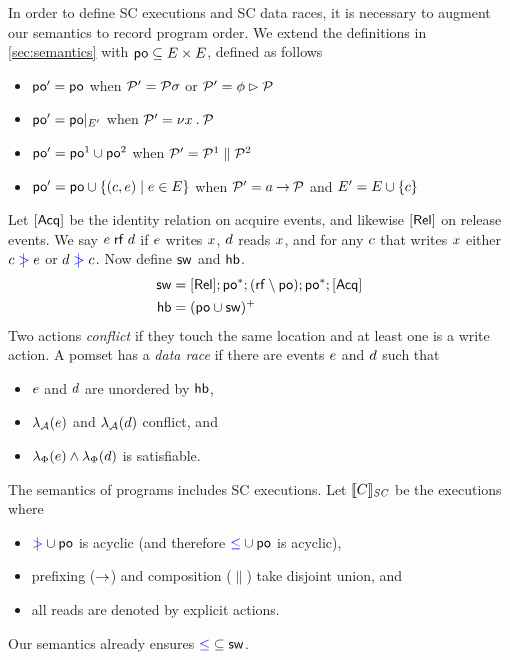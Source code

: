 In order to define SC executions and SC data races, it is necessary to
augment our semantics to record program order.  We extend the definitions in
\textsection\ref{sec:semantics} with
${\mathrel{\mathsf{po}}}\subseteq{E}\times{E}$, defined as follows
\begin{itemize}
\item
  ${\mathrel{\mathsf{po}}'} = {\mathrel{\mathsf{po}}}$
  when $\mathcal{P}'=\mathcal{P}\sigma$
  or $\mathcal{P}'=\phi\mathbin\rhd\mathcal{P}$
\item
  ${\mathrel{\mathsf{po}}'} = {\mathrel{\mathsf{po}}}\mathbin{|}_{E'}$
  when $\mathcal{P}'=\nu x\mathbin.\mathcal{P}$
\item
  ${\mathrel{\mathsf{po}}'} = {\mathrel{\mathsf{po}}}^1\cup{\ensuremath{\mathrel{\mathsf{po}}}}^2$
  when $\mathcal{P}'=\mathcal{P}^1\parallel\mathcal{P}^2$
\item
  ${\mathrel{\mathsf{po}}'} = {\mathrel{\mathsf{po}}}\cup\{(c,e)\mid e\in E\}$
  when $\mathcal{P}'=a\mathbin\rightarrow\mathcal{P}$ and $E' = E \cup \{c\}$
\end{itemize}
Let $[\mathsf{Acq}]$ be the identity relation on acquire events, and likewise $[\mathsf{Rel}]$ on release events.
We say $e\mathrel{\mathsf{rf}}d$ if $e$ writes $x$, $d$ reads $x$, and for any $c$ that writes $x$ either $c\mathrel{{\color{blue}\mkern4mu\mid\!\!\!>}}e$ or $d\mathrel{{\color{blue}\mkern4mu\mid\!\!\!>}}c$.
Now define $\mathrel{\mathsf{sw}}$ and $\mathrel{\mathsf{hb}}$.
\begin{align*}
  {\ensuremath{\mathrel{\mathsf{sw}}}} &= [\mathsf{Rel}]; {\mathrel{\mathsf{po}}}^*; ({\mathrel{\mathsf{rf}}}\setminus{\ensuremath{\mathrel{\mathsf{po}}}}); {\mathrel{\mathsf{po}}}^*; [\mathsf{Acq}]
  \\
  {\mathrel{\mathsf{hb}}} &= ({\mathrel{\mathsf{po}}} \cup {\ensuremath{\mathrel{\mathsf{sw}}}})^+
\end{align*}
Two actions \emph{conflict} if they touch the same location and at least one
is a write action.  A pomset has a \emph{data race} if there are events
$e$ and $d$ such that 
\begin{itemize}
\item $e$ and $d$ are unordered by $\mathrel{\mathsf{hb}}$,
\item $\lambda_{\mathcal{A}}(e)$ and $\lambda_{\mathcal{A}}(d)$ conflict, and
\item $\lambda_{\Phi}(e)\land\lambda_{\Phi}(d)$ is satisfiable.
\end{itemize}
The semantics of programs includes SC executions.  Let $\llbracket C\rrbracket_{\textit{SC}}$ be the
executions where
\begin{itemize}
\item ${\mathrel{{\color{blue}\mkern4mu\mid\!\!\!>}}}\cup{\ensuremath{\mathrel{\mathsf{po}}}}$ is acyclic (and therefore ${\mathrel{{\color{blue}\leq}}}\cup{\ensuremath{\mathrel{\mathsf{po}}}}$ is acyclic),
\item prefixing ($\mathbin\rightarrow$) and composition ($\parallel$) take disjoint union, and
\item all reads are denoted by explicit actions.
\end{itemize}
Our semantics already ensures ${\mathrel{{\color{blue}\leq}}}\subseteq{\ensuremath{\mathrel{\mathsf{sw}}}}$.

